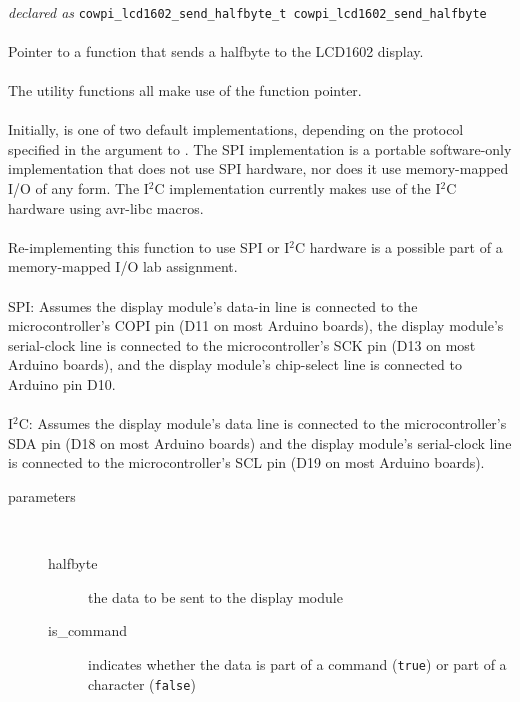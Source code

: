 \begin{itemize}
{             \\
            \textit{declared as} \lstinline{cowpi_lcd1602_send_halfbyte_t cowpi_lcd1602_send_halfbyte} \\ \\
                Pointer to a function that sends a halfbyte to the LCD1602 display. \\ \\
                The  utility functions all make use of the  function pointer. \\ \\
                Initially,  is one of two default implementations, depending on the protocol specified in the argument to .
                The SPI implementation is a portable software-only implementation that does not use SPI hardware, nor does it use memory-mapped I/O of any form.
                The I$^2$C implementation currently makes use of the I$^2$C hardware using avr-libc macros. \\ \\
                Re-implementing this function to use SPI or I$^2$C hardware is a possible part of a memory-mapped I/O lab assignment. \\ \\
                SPI: Assumes the display module's data-in line is connected to the microcontroller's COPI pin (D11 on most Arduino boards), the display module's serial-clock line is connected to the microcontroller's SCK pin (D13 on most Arduino boards), and the display module's chip-select line is connected to Arduino pin D10. \\ \\
                I$^2$C: Assumes the display module's data line is connected to the microcontroller's SDA pin (D18 on most Arduino boards) and the display module's serial-clock line is connected to the microcontroller's SCL pin (D19 on most Arduino boards).
                \begin{description}
                    \item[parameters] \
                    \begin{description}
                        \item[halfbyte] the data to be sent to the display module
                        \item[is\_command] indicates whether the data is part of a command (\lstinline{true}) or part of a character (\lstinline{false})

\end{description}
\end{description}}
\end{itemize}
